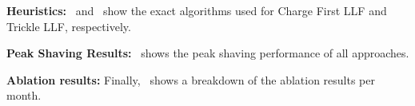 



 




\noindent \textbf{Heuristics:}~ and~ show the exact algorithms used for Charge First LLF and Trickle LLF, respectively.

\noindent \textbf{Peak Shaving Results:}~ shows the peak shaving performance of all approaches. 

\noindent \textbf{Ablation results:} Finally,~ shows a breakdown of the ablation results per month.





